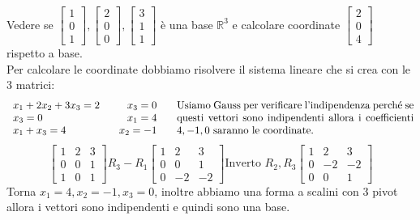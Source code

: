 \begin{example}
Vedere se $\begin{bmatrix}1\\0\\1\end{bmatrix}, \begin{bmatrix}2\\0\\0\end{bmatrix}, \begin{bmatrix}3\\1\\1\end{bmatrix}$ è una base $\mathbb{R}^3$
e calcolare coordinate $\begin{bmatrix}2\\0\\4\end{bmatrix}$ rispetto a base. \\
Per calcolare le coordinate dobbiamo risolvere il sistema lineare che si crea con le 3 matrici:
\[
\begin{array}{l}
x_1 + 2x_2 + 3x_3 = 2\\
x_3 = 0\\
x_1 + x_3 = 4
\end{array}
\hspace{.3cm}
\begin{array}{r}
x_3 = 0\\
x_1 = 4\\
x_2 = -1
\end{array}
\hspace{.5cm}
\parbox{8cm}{Usiamo Gauss per verificare l'indipendenza perché se questi vettori sono indipendenti allora i coefficienti $4, -1, 0$ saranno le coordinate.}
\]
\[
\begin{bmatrix}
1 & 2 & 3\\
0 & 0 & 1\\
1 & 0 & 1
\end{bmatrix}
R_3 - R_1
\begin{bmatrix}
1 & 2 & 3\\
0 & 0 & 1\\
0 & -2 & -2
\end{bmatrix}
\text{Inverto } R_2, R_3
\begin{bmatrix}
1 & 2 & 3\\
0 & -2 & -2\\
0 & 0 & 1
\end{bmatrix}
\]
Torna $x_1 = 4, x_2 = -1, x_3 = 0$, inoltre abbiamo una forma a scalini con 3 pivot allora i vettori sono indipendenti e quindi sono una base.
\end{example}

